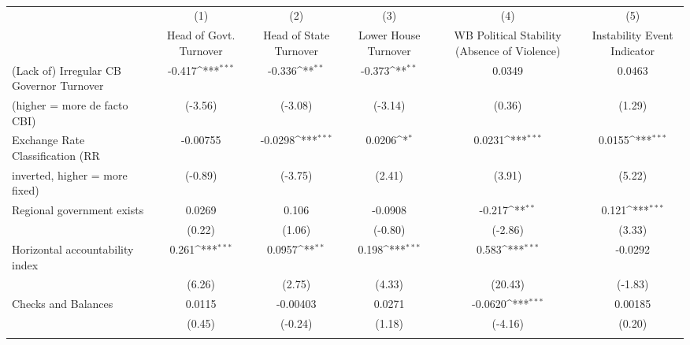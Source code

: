 \begin{table}[htbp]\centering
\def\sym#1{\ifmmode^{#1}\else\(^{#1}\)\fi}
\caption{\label{nccmultIndOLSDF}}
\begin{tabular}{l*{5}{c}}
\toprule
                                        &\multicolumn{1}{c}{(1)}&\multicolumn{1}{c}{(2)}&\multicolumn{1}{c}{(3)}&\multicolumn{1}{c}{(4)}&\multicolumn{1}{c}{(5)}\\
                                        &\multicolumn{1}{c}{Head of Govt. Turnover}&\multicolumn{1}{c}{Head of State Turnover}&\multicolumn{1}{c}{Lower House Turnover}&\multicolumn{1}{c}{WB Political Stability (Absence of Violence)}&\multicolumn{1}{c}{Instability Event Indicator}\\
\midrule
(Lack of) Irregular CB Governor Turnover&   -0.417\sym{***}&   -0.336\sym{**} &   -0.373\sym{**} &   0.0349         &   0.0463         \\
(higher = more de facto CBI)            &  (-3.56)         &  (-3.08)         &  (-3.14)         &   (0.36)         &   (1.29)         \\
\addlinespace
Exchange Rate Classification (RR        & -0.00755         &  -0.0298\sym{***}&   0.0206\sym{*}  &   0.0231\sym{***}&   0.0155\sym{***}\\
inverted, higher = more fixed)          &  (-0.89)         &  (-3.75)         &   (2.41)         &   (3.91)         &   (5.22)         \\
\addlinespace
Regional government exists              &   0.0269         &    0.106         &  -0.0908         &   -0.217\sym{**} &    0.121\sym{***}\\
                                        &   (0.22)         &   (1.06)         &  (-0.80)         &  (-2.86)         &   (3.33)         \\
\addlinespace
Horizontal accountability index         &    0.261\sym{***}&   0.0957\sym{**} &    0.198\sym{***}&    0.583\sym{***}&  -0.0292         \\
                                        &   (6.26)         &   (2.75)         &   (4.33)         &  (20.43)         &  (-1.83)         \\
\addlinespace
Checks and Balances                     &   0.0115         & -0.00403         &   0.0271         &  -0.0620\sym{***}&  0.00185         \\
                                        &   (0.45)         &  (-0.24)         &   (1.18)         &  (-4.16)         &   (0.20)         \\
\addlinespace

\end{tabular}
\end{table}
